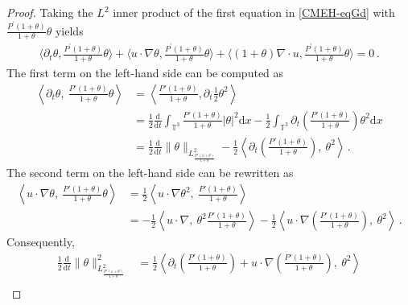 \documentclass[reqno,11pt]{amsart}
\numberwithin{equation}{section}
\def\p{\partial}
\def\d{\mathrm{d}}
\begin{document}
\begin{proof}

Taking the $L^2$ inner product of the first equation in \eqref{CMEH-eqGd} with $\frac{P^\prime(1+\theta)}{1+\theta}\theta$ yields
\begin{equation*}
\begin{aligned}
\langle\p_t \theta,\frac{P^\prime(1+\theta)}{1+\theta}\theta \rangle +\langle u\cdot\nabla\theta,\frac{P^\prime(1+\theta)}{1+\theta}\theta \rangle +\langle(1+\theta)\nabla\cdot u,\frac{P^\prime(1+\theta)}{1+\theta}\theta \rangle  = 0 \,.
\end{aligned}
\end{equation*}
The first term on the left-hand side can be computed as
\begin{equation*}
\begin{aligned}
\left\langle \partial_t \theta,\ \frac{P'(1+\theta)}{1+\theta} \theta \right\rangle & = \left\langle \frac{P'(1+\theta)}{1+\theta} ,\partial_t \frac{1}{2}\theta^2 \right\rangle \\
& = \frac{1}{2}\frac{\d}{\d t} \int_{\mathbb{T}^3} \frac{P'(1+\theta)}{1+\theta} |\theta|^2 \d x - \frac{1}{2} \int_{\mathbb{T}^3} \partial_t \left( \frac{P'(1+\theta)}{1+\theta} \right) \theta^2 \d x \\
& = \frac{1}{2}\frac{\d}{\d t} \|\theta\|_{L^2_{\frac{P'(1+\theta)}{1+\theta}} }- \frac{1}{2} \left\langle \partial_t \left( \frac{P'(1+\theta)}{1+\theta} \right),\ \theta^2 \right\rangle \,.
\end{aligned}
\end{equation*}
The second term on the left-hand side can be rewritten as
\begin{equation*}
\begin{aligned}
\left\langle u \cdot \nabla \theta,\ \frac{P'(1+\theta)}{1+\theta} \theta \right\rangle& = \frac{1}{2} \left\langle u \cdot \nabla \theta^2,\ \frac{P'(1+\theta)}{1+\theta} \right\rangle \\
& = -\frac{1}{2}\left\langle u \cdot \nabla,\ \theta^2 \frac{P'(1+\theta)}{1+\theta} \right\rangle - \frac{1}{2}\left\langle u \cdot \nabla \left( \frac{P'(1+\theta)}{1+\theta} \right),\ \theta^2 \right\rangle \,.
\end{aligned}
\end{equation*}
Consequently,
\begin{equation*}
\begin{aligned}
\frac{1}{2}\frac{\d}{\d t} \|\theta\|^2_{L^2_{\frac{P'(1+\theta)}{1+\theta}}} & = \frac{1}{2} \left\langle \partial_t \left( \frac{P'(1+\theta)}{1+\theta} \right) + u \cdot \nabla \left( \frac{P'(1+\theta)}{1+\theta} \right),\ \theta^2 \right\rangle \\

\end{aligned}
\end{equation*}
\end{proof}
\end{document}
